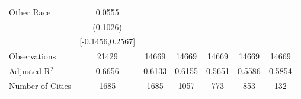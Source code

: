 \documentclass{article}
\begin{document}
\begin{table}[htbp]
\begin{tabular}{l*{6}{c}}
Other Race          &      0.0555   &               &               &               &               &               \\
                    &    (0.1026)   &               &               &               &               &               \\
                    &[-0.1456,0.2567]   &               &               &               &               &               \\
\midrule
Observations        &       21429   &       14669   &       14669   &       14669   &       14669   &       14669   \\
Adjusted R$^2$      &      0.6656   &      0.6133   &      0.6155   &      0.5651   &      0.5586   &      0.5854   \\
Number of Cities    &        1685   &        1685   &        1057   &         773   &         853   &         132   \\
\bottomrule
\end{tabular}
\end{table}
\end{document}
